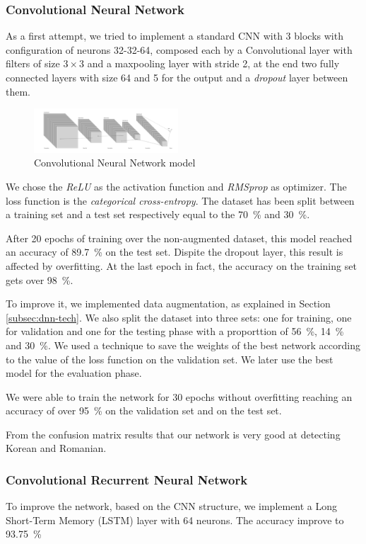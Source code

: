 \documentclass{article}
\begin{document}
\subsubsection{Convolutional Neural Network}
As a first attempt, we tried to implement a standard CNN with 3 blocks with configuration of neurons 32-32-64, composed each by a Convolutional layer with filters of size $3\times 3$ and a maxpooling layer with stride 2, at the end two fully connected layers with size 64 and 5 for the output and a \emph{dropout} layer between them.
\begin{figure}[h]
    \centering
    \includegraphics[width=0.48\textwidth]{img/cnn_figure.PNG}
    \caption{Convolutional Neural Network model}
    \label{fig:CNN model}
\end{figure}

We chose the \emph{ReLU} as the activation function and \emph{RMSprop} as optimizer. The loss function is the \emph{categorical cross-entropy}. The dataset has been split between a training set and a test set respectively equal to the \SI{70}{\percent} and \SI{30}{\percent}.

After 20 epochs of training over the non-augmented dataset, this model reached an accuracy of \SI{89.7}{\percent} on the test set.
Dispite the dropout layer, this result is affected by overfitting. At the last epoch in fact, the accuracy on the training set gets over \SI{98}{\percent}.

To improve it, we implemented data augmentation, as explained in Section \ref{subsec:dnn-tech}. We also split the dataset into three sets: one for training, one for validation and one for the testing phase with a proporttion of \SI{56}{\percent}, \SI{14}{\percent}  and \SI{30}{\percent}. We used a technique to save the weights of the best network according to the value of the loss function on the validation set. We later use the best model for the evaluation phase.

We were able to train the network for 30 epochs without overfitting reaching an accuracy of over \SI{95}{\percent} on the validation set and  on the test set.

From the confusion matrix results that our network is very good at detecting Korean and Romanian.

\subsubsection{Convolutional Recurrent Neural Network}
To improve the network, based on the CNN structure, we implement a Long Short-Term Memory (LSTM) layer with 64 neurons. The accuracy improve to \SI{93.75}{\percent}
\end{document}
